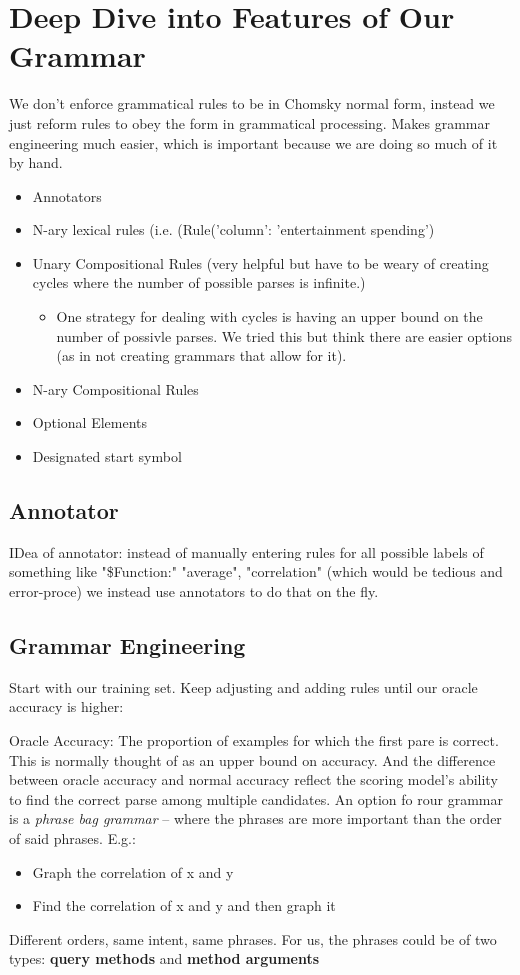\documentclass[pageno]{jpaper}
\begin{document}
\section{Deep Dive into Features of Our Grammar}
We don't enforce grammatical rules to be in Chomsky normal form, instead we just reform rules to obey the form in grammatical processing. Makes grammar engineering much easier, which is important because we are doing so much of it by hand.
\begin{itemize}
\item Annotators
\item N-ary lexical rules (i.e. (Rule('column': 'entertainment spending')
\item Unary Compositional Rules (very helpful but have to be weary of creating cycles where the number of possible parses is infinite.)
\begin{itemize}
\item One strategy for dealing with cycles is having an upper bound on the number of possivle parses. We tried this but think there are easier options (as in not creating grammars that allow for it).
\end{itemize}
\item N-ary Compositional Rules
\item Optional Elements
\item Designated start symbol
\end{itemize}

\subsection{Annotator}
IDea of annotator: instead of manually entering rules for all possible labels of something like "\$Function:" "average", "correlation" (which would be tedious and error-proce) we instead use annotators to do that on the fly. 

\subsection{Grammar Engineering}
Start with our training set. Keep adjusting and adding rules until our oracle accuracy is higher:

Oracle Accuracy: The proportion of examples for which the first pare is correct. This is normally thought of as an upper bound on accuracy. And the difference between oracle accuracy and normal accuracy reflect the scoring model's ability to find the correct parse among multiple candidates.
 An option fo rour grammar is a \textit{phrase bag grammar} -- where the phrases are more important than the order of said phrases. E.g.:
\begin{itemize}
\item Graph the  correlation of x and y 
\item Find the correlation of x and y and then graph it
\end{itemize}
Different orders, same intent, same phrases.
For us, the phrases could be of two types: \textbf{query methods} and \textbf{method arguments} \\
\end{document}
